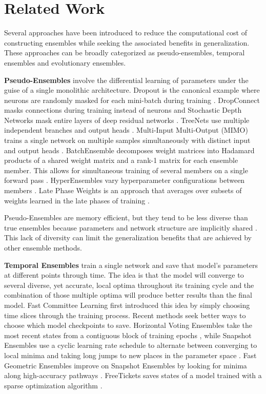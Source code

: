 \documentclass[letterpaper]{article} %
\begin{document}
\section{Related Work}

Several approaches have been introduced to reduce the computational cost of constructing ensembles while seeking the associated benefits in generalization. These approaches can be broadly categorized as pseudo-ensembles, temporal ensembles and evolutionary ensembles.

\textbf{Pseudo-Ensembles} involve the differential learning of parameters under the guise of a single monolithic architecture. Dropout is the canonical example where neurons are randomly masked for each mini-batch during training \cite{srivastava2014dropout}. DropConnect masks connections during training instead of neurons \cite{wan2013regularization} and Stochastic Depth Networks mask entire layers of deep residual networks \cite{huang2016stochastic}. TreeNets use multiple independent branches and output heads \cite{lee2015m}. Multi-Input Multi-Output (MIMO) trains a single network on multiple samples simultaneously with distinct input and output heads \cite{havasi2021training}. BatchEnsemble decomposes weight matrices into Hadamard products of a shared weight matrix and a rank-1 matrix for each ensemble member. This allows for simultaneous training of several members on a single forward pass \cite{wen2020batchensemble}. HyperEnsembles vary hyperparameter configurations between members \cite{wenzel2021hyperparameter}. Late Phase Weights is an approach that averages over subsets of weights learned in the late phases of training \cite{vonoswald2021neural}.

Pseudo-Ensembles are memory efficient, but they tend to be less diverse than true ensembles because parameters and network structure are implicitly shared \cite{bachman2014learning}. This lack of diversity can limit the generalization benefits that are achieved by other ensemble methods.

\textbf{Temporal Ensembles} train a single network and save that model's parameters at different points through time. The idea is that the model will converge to several diverse, yet accurate, local optima throughout its training cycle and the combination of those multiple optima will produce better results than the final model. Fast Committee Learning \cite{swann1998fast} first introduced this idea by simply choosing time slices through the training process. Recent methods seek better ways to choose which model checkpoints to save. Horizontal Voting Ensembles take the most recent states from a contiguous block of training epochs \cite{xie2013horizontal}, while Snapshot Ensembles use a cyclic learning rate schedule to alternate between converging to local minima and taking long jumps to new places in the parameter space \cite{huang2017snapshot}. Fast Geometric Ensembles improve on Snapshot Ensembles by looking for minima along high-accuracy pathways \cite{garipov2018loss}. FreeTickets saves states of a model trained with a sparse optimization algorithm \cite{liu2021freetickets}.
\end{document}
